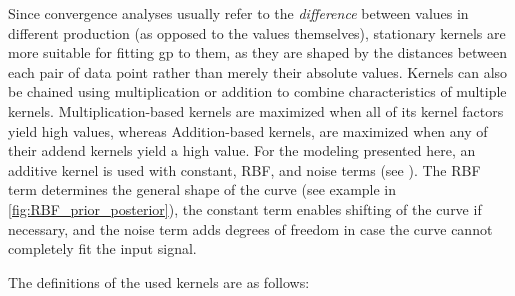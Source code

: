 Since convergence analyses usually refer to the \textit{difference} between values in different production (as opposed to the values themselves), stationary kernels are more suitable for fitting \ac{gp} to them, as they are shaped by the distances between each pair of data point rather than merely their absolute values.
Kernels can also be chained using multiplication or addition to combine characteristics of multiple kernels.
Multiplication-based kernels are maximized when all of its kernel factors yield high values, whereas
Addition-based kernels, are maximized when any of their addend kernels yield a high value.
For the modeling presented here, an additive kernel is used with constant, RBF, and noise terms (see ).
The RBF term determines the general shape of the curve (see example in \cref{fig:RBF_prior_posterior}), the constant term enables shifting of the curve if necessary, and the noise term adds degrees of freedom in case the curve cannot completely fit the input signal.

The definitions of the used kernels are as follows:

